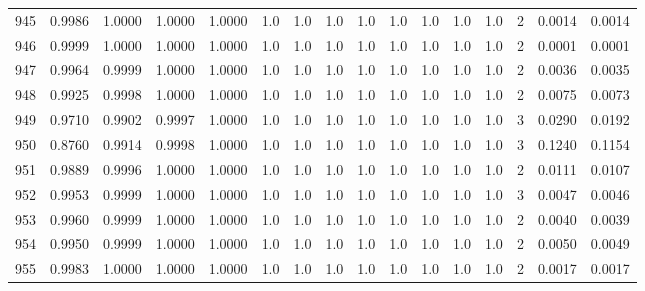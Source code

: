 \begin{tabular}{lrrrrrrrrrrrrrrr}
945 &      0.9986 &  1.0000 &  1.0000 &  1.0000 &     1.0 &     1.0 &     1.0 &     1.0 &     1.0 &     1.0 &      1.0 &        1.0 &      2 &                    0.0014 &                     0.0014 \\
946 &      0.9999 &  1.0000 &  1.0000 &  1.0000 &     1.0 &     1.0 &     1.0 &     1.0 &     1.0 &     1.0 &      1.0 &        1.0 &      2 &                    0.0001 &                     0.0001 \\
947 &      0.9964 &  0.9999 &  1.0000 &  1.0000 &     1.0 &     1.0 &     1.0 &     1.0 &     1.0 &     1.0 &      1.0 &        1.0 &      2 &                    0.0036 &                     0.0035 \\
948 &      0.9925 &  0.9998 &  1.0000 &  1.0000 &     1.0 &     1.0 &     1.0 &     1.0 &     1.0 &     1.0 &      1.0 &        1.0 &      2 &                    0.0075 &                     0.0073 \\
949 &      0.9710 &  0.9902 &  0.9997 &  1.0000 &     1.0 &     1.0 &     1.0 &     1.0 &     1.0 &     1.0 &      1.0 &        1.0 &      3 &                    0.0290 &                     0.0192 \\
950 &      0.8760 &  0.9914 &  0.9998 &  1.0000 &     1.0 &     1.0 &     1.0 &     1.0 &     1.0 &     1.0 &      1.0 &        1.0 &      3 &                    0.1240 &                     0.1154 \\
951 &      0.9889 &  0.9996 &  1.0000 &  1.0000 &     1.0 &     1.0 &     1.0 &     1.0 &     1.0 &     1.0 &      1.0 &        1.0 &      2 &                    0.0111 &                     0.0107 \\
952 &      0.9953 &  0.9999 &  1.0000 &  1.0000 &     1.0 &     1.0 &     1.0 &     1.0 &     1.0 &     1.0 &      1.0 &        1.0 &      3 &                    0.0047 &                     0.0046 \\
953 &      0.9960 &  0.9999 &  1.0000 &  1.0000 &     1.0 &     1.0 &     1.0 &     1.0 &     1.0 &     1.0 &      1.0 &        1.0 &      2 &                    0.0040 &                     0.0039 \\
954 &      0.9950 &  0.9999 &  1.0000 &  1.0000 &     1.0 &     1.0 &     1.0 &     1.0 &     1.0 &     1.0 &      1.0 &        1.0 &      2 &                    0.0050 &                     0.0049 \\
955 &      0.9983 &  1.0000 &  1.0000 &  1.0000 &     1.0 &     1.0 &     1.0 &     1.0 &     1.0 &     1.0 &      1.0 &        1.0 &      2 &                    0.0017 &                     0.0017 \\

\end{tabular}
